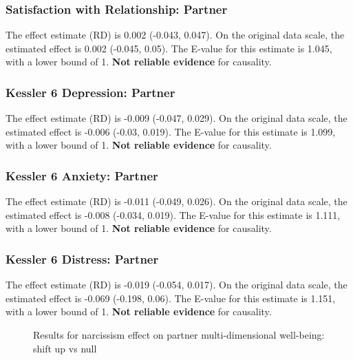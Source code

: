 \documentclass[
  singlecolumn]{article}
\begin{document}
\subsubsection{Satisfaction with Relationship:
Partner}\label{satisfaction-with-relationship-partner-5}

The effect estimate (RD) is 0.002 (-0.043, 0.047). On the original data
scale, the estimated effect is 0.002 (-0.045, 0.05). The E-value for
this estimate is 1.045, with a lower bound of 1. \textbf{Not reliable
evidence} for causality.

\subsubsection{Kessler 6 Depression:
Partner}\label{kessler-6-depression-partner-5}

The effect estimate (RD) is -0.009 (-0.047, 0.029). On the original data
scale, the estimated effect is -0.006 (-0.03, 0.019). The E-value for
this estimate is 1.099, with a lower bound of 1. \textbf{Not reliable
evidence} for causality.

\subsubsection{Kessler 6 Anxiety:
Partner}\label{kessler-6-anxiety-partner-5}

The effect estimate (RD) is -0.011 (-0.049, 0.026). On the original data
scale, the estimated effect is -0.008 (-0.034, 0.019). The E-value for
this estimate is 1.111, with a lower bound of 1. \textbf{Not reliable
evidence} for causality.

\subsubsection{Kessler 6 Distress:
Partner}\label{kessler-6-distress-partner-5}

The effect estimate (RD) is -0.019 (-0.054, 0.017). On the original data
scale, the estimated effect is -0.069 (-0.198, 0.06). The E-value for
this estimate is 1.151, with a lower bound of 1. \textbf{Not reliable
evidence} for causality.

\begin{figure}


\caption{\label{fig-results-narcissism-partner-up}Results for narcissism
effect on partner multi-dimensional well-being: shift up vs null}

\end{figure}%
\end{document}

